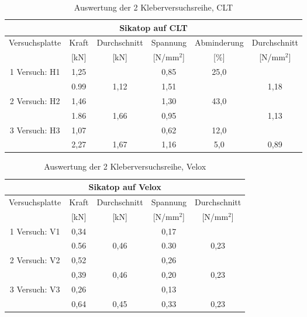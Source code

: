 \documentclass[12 pt,a4 paper ]{scrreprt}
\begin{document}
\begin{table}
\caption{Auswertung der 2 Kleberversuchsreihe, CLT}
\begin{tabular}{|c|c|c|c|c|c|} \hline
\multicolumn{6}{|c|}{Sikatop auf CLT} \\\hline
Versuchsplatte & Kraft & Durchschnitt & Spannung & Abminderung & Durchschnitt \\\hline
	& [kN] & [kN] & [N/mm$^{2}$] & [\%] & [N/mm$^{2}$] \\
	\hline\hline
\cline{2-2} 1 Versuch: H1  & 1,25 & & 0,85& 25,0& \\\cline{2-2}&0.99 & 1,12 &1,51 & & 1,18
\\\hline\hline

\cline{2-2} 2 Versuch: H2  & 1,46 & & 1,30& 43,0& \\\cline{2-2}&1.86 & 1,66 &0,95 & & 1,13
\\\hline\hline

\cline{2-2} 3 Versuch: H3 & 1,07 & & 0,62&12,0 & \\\cline{2-2}&2,27 &1,67 &1,16 & 5,0 & 0,89 
\\\hline

\end{tabular}
 \label{tab:2.1 kleberversuche}
 \end{table}

\begin{table}
\caption{Auswertung der 2 Kleberversuchsreihe, Velox}
\begin{center}


\begin{tabular}{|c|c|c|c|c|} \hline
\multicolumn{5}{|c|}{Sikatop auf Velox} \\\hline
Versuchsplatte & Kraft & Durchschnitt & Spannung & Durchschnitt \\\hline
	& [kN] & [kN] & [N/mm$^{2}$] & [N/mm$^{2}$] \\
	\hline\hline
\cline{2-2} 1 Versuch: V1  & 0,34 & & 0,17&  \\\cline{2-2}&0.56 & 0,46 &0.30 &0,23
\\\hline\hline

\cline{2-2} 2 Versuch: V2  & 0,52 & & 0,26 &  \\\cline{2-2}&0,39 & 0,46 &0,20 & 0,23
\\\hline\hline

\cline{2-2} 3 Versuch: V3 & 0,26 & & 0,13 & \\\cline{2-2}&0,64 & 0,45 & 0,33 & 0,23  
\\\hline
\end{tabular}

\label{tab:2.2kleberversuche}

\end{center}
\end{table}
\end{document}
